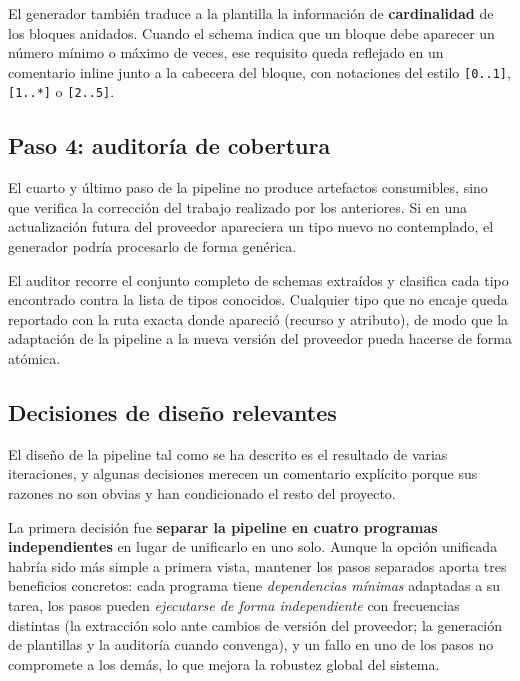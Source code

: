 \documentclass{article}
\begin{document}
{        \justify
        El generador también traduce a la plantilla la información de
        \textbf{cardinalidad} de los bloques anidados. Cuando el schema indica que un
        bloque debe aparecer un número mínimo o máximo de veces, ese requisito queda
        reflejado en un comentario inline junto a la cabecera del bloque, con
        notaciones del estilo \texttt{[0..1]}, \texttt{[1..*]} o \texttt{[2..5]}.


        \subsection{Paso 4: auditoría de cobertura}
        \justify
        El cuarto y último paso de la pipeline no produce artefactos consumibles, sino
        que verifica la corrección del trabajo realizado por los anteriores. Si en una
        actualización futura del proveedor apareciera un tipo nuevo no contemplado, el
        generador podría procesarlo de forma genérica.

        \justify
        El auditor recorre el conjunto completo de schemas extraídos y clasifica cada
        tipo encontrado contra la lista de tipos conocidos. Cualquier tipo que no
        encaje queda reportado con la ruta exacta donde apareció (recurso y
        atributo), de modo que la adaptación de la pipeline a la nueva versión del
        proveedor pueda hacerse de forma atómica.


        \subsection{Decisiones de diseño relevantes}
        \justify
        El diseño de la pipeline tal como se ha descrito es el resultado de varias
        iteraciones, y algunas decisiones merecen un comentario explícito porque sus
        razones no son obvias y han condicionado el resto del proyecto.

        \justify
        La primera decisión fue \textbf{separar la pipeline en cuatro programas
        independientes} en lugar de unificarlo en uno solo. Aunque la opción
        unificada habría sido más simple a primera vista, mantener los pasos
        separados aporta tres beneficios concretos: cada programa tiene
        \textit{dependencias mínimas} adaptadas a su tarea, los pasos pueden
        \textit{ejecutarse de forma independiente} con frecuencias distintas (la
        extracción solo ante cambios de versión del proveedor; la generación de
        plantillas y la auditoría cuando convenga), y un fallo en uno de los pasos no
        compromete a los demás, lo que mejora la robustez global del sistema.

}
\end{document}
